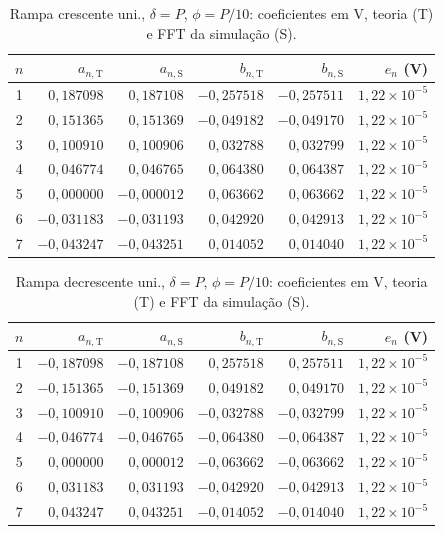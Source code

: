 \begin{table}[H]
\centering
\footnotesize\setlength{\tabcolsep}{2pt}
\caption{Rampa crescente uni., $\delta=P$, $\phi=P/10$: coeficientes em V, teoria (T) e FFT da simulação (S).}\label{tab:coef_comp7}
\begin{tabular}{crrrrr}\hline
$n$ & $a_{n,\mathrm T}$ & $a_{n,\mathrm S}$ & $b_{n,\mathrm T}$ & $b_{n,\mathrm S}$ & $e_n$ (V) \\ \hline
1 & $0{,}187098$ & $0{,}187108$ & $-0{,}257518$ & $-0{,}257511$ & $1{,}22\!\times\!10^{-5}$ \\
2 & $0{,}151365$ & $0{,}151369$ & $-0{,}049182$ & $-0{,}049170$ & $1{,}22\!\times\!10^{-5}$ \\
3 & $0{,}100910$ & $0{,}100906$ & $0{,}032788$ & $0{,}032799$ & $1{,}22\!\times\!10^{-5}$ \\
4 & $0{,}046774$ & $0{,}046765$ & $0{,}064380$ & $0{,}064387$ & $1{,}22\!\times\!10^{-5}$ \\
5 & $0{,}000000$ & $-0{,}000012$ & $0{,}063662$ & $0{,}063662$ & $1{,}22\!\times\!10^{-5}$ \\
6 & $-0{,}031183$ & $-0{,}031193$ & $0{,}042920$ & $0{,}042913$ & $1{,}22\!\times\!10^{-5}$ \\
7 & $-0{,}043247$ & $-0{,}043251$ & $0{,}014052$ & $0{,}014040$ & $1{,}22\!\times\!10^{-5}$ \\
\hline\end{tabular}
\end{table}
\begin{table}[H]
\centering
\footnotesize\setlength{\tabcolsep}{2pt}
\caption{Rampa decrescente uni., $\delta=P$, $\phi=P/10$: coeficientes em V, teoria (T) e FFT da simulação (S).}\label{tab:coef_comp8}
\begin{tabular}{crrrrr}\hline
$n$ & $a_{n,\mathrm T}$ & $a_{n,\mathrm S}$ & $b_{n,\mathrm T}$ & $b_{n,\mathrm S}$ & $e_n$ (V) \\ \hline
1 & $-0{,}187098$ & $-0{,}187108$ & $0{,}257518$ & $0{,}257511$ & $1{,}22\!\times\!10^{-5}$ \\
2 & $-0{,}151365$ & $-0{,}151369$ & $0{,}049182$ & $0{,}049170$ & $1{,}22\!\times\!10^{-5}$ \\
3 & $-0{,}100910$ & $-0{,}100906$ & $-0{,}032788$ & $-0{,}032799$ & $1{,}22\!\times\!10^{-5}$ \\
4 & $-0{,}046774$ & $-0{,}046765$ & $-0{,}064380$ & $-0{,}064387$ & $1{,}22\!\times\!10^{-5}$ \\
5 & $0{,}000000$ & $0{,}000012$ & $-0{,}063662$ & $-0{,}063662$ & $1{,}22\!\times\!10^{-5}$ \\
6 & $0{,}031183$ & $0{,}031193$ & $-0{,}042920$ & $-0{,}042913$ & $1{,}22\!\times\!10^{-5}$ \\
7 & $0{,}043247$ & $0{,}043251$ & $-0{,}014052$ & $-0{,}014040$ & $1{,}22\!\times\!10^{-5}$ \\
\hline\end{tabular}
\end{table}
